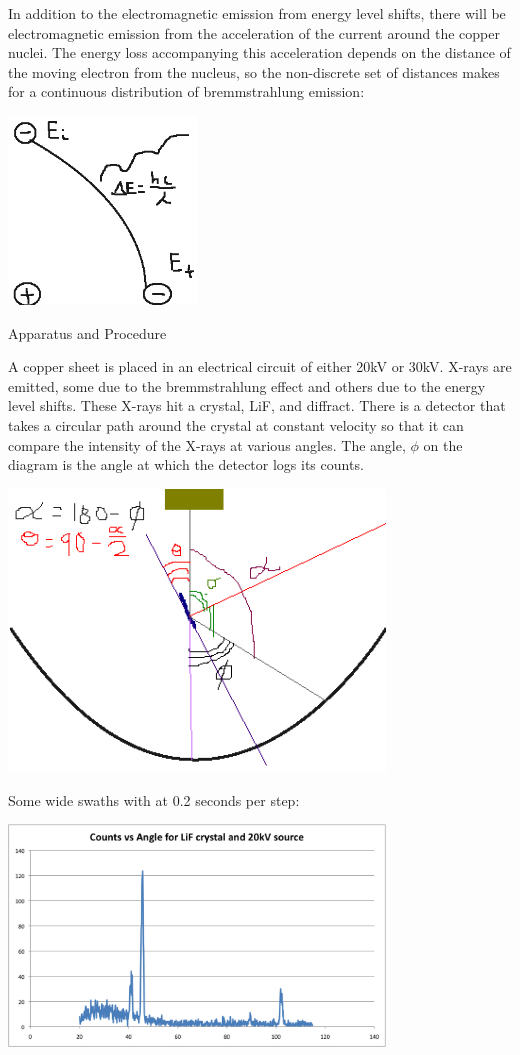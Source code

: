 \documentclass{article}
\begin{document}
In addition to the electromagnetic emission from energy level shifts, there will be electromagnetic emission from the acceleration of the current around the copper nuclei. The energy loss accompanying this acceleration depends on the distance of the moving electron from the nucleus, so the non-discrete set of distances makes for a continuous distribution of bremmstrahlung emission:

\includegraphics[width=5cm]{images/Brem}

\begin{center} Apparatus and Procedure \end{center}

A copper sheet is placed in an electrical circuit of either 20kV or 30kV. X-rays are emitted, some due to the bremmstrahlung effect and others due to the energy level shifts. These X-rays hit a crystal, LiF, and diffract. There is a detector that takes a circular path around the crystal at constant velocity so that it can compare the intensity of the X-rays at various angles. The angle, $\phi$ on the diagram is the angle at which the detector logs its counts.

\includegraphics[width=10cm]{images/Apparatus}

Some wide swaths with at 0.2 seconds per step:

\includegraphics[width=10cm]{images/LiF20kV}
\end{document}
